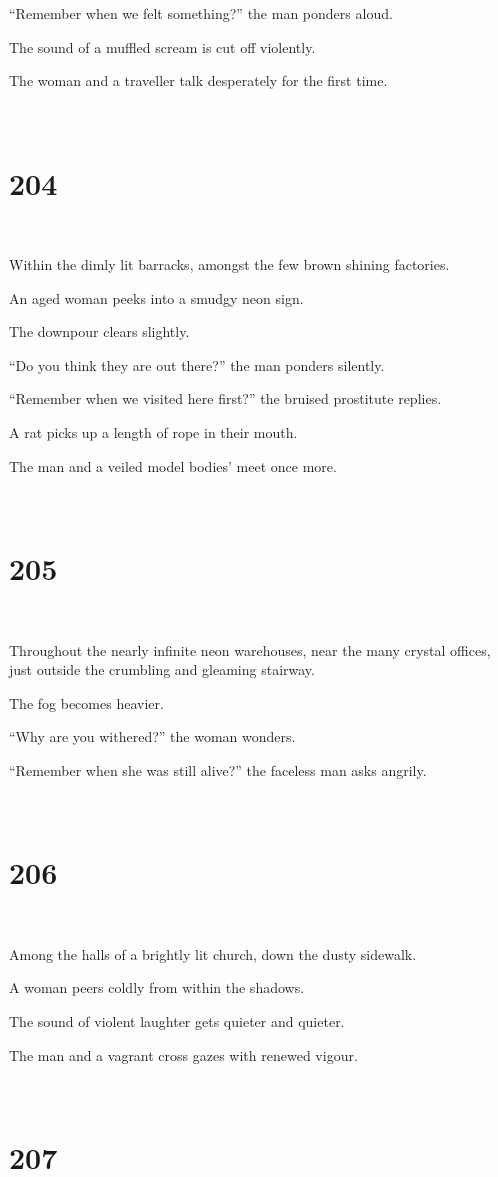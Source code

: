 \documentclass{report}
\begin{document}
``Remember when we felt something?'' the man ponders aloud.

The sound of a muffled scream is cut off violently.

The woman and a traveller talk desperately for the first time.

~
\chapter*{204}
~

Within the dimly lit barracks, amongst the few brown shining factories.

An aged woman peeks into a smudgy neon sign.

The downpour clears slightly.

``Do you think they are out there?'' the man ponders silently.

``Remember when we visited here first?'' the bruised prostitute replies.

A rat picks up a length of rope in their mouth.

The man and a veiled model bodies' meet once more.

~
\chapter*{205}
~

Throughout the nearly infinite neon warehouses, near the many crystal offices, just outside the crumbling and gleaming stairway.

The fog becomes heavier.

``Why are you withered?'' the woman wonders.

``Remember when she was still alive?'' the faceless man asks angrily.

~
\chapter*{206}
~

Among the halls of a brightly lit church, down the dusty sidewalk.

A woman peers coldly from within the shadows.

The sound of violent laughter gets quieter and quieter.

The man and a vagrant cross gazes with renewed vigour.

~
\chapter*{207}
~
\end{document}
